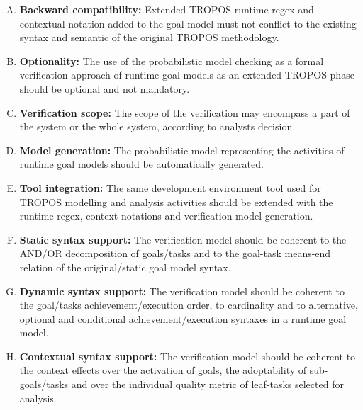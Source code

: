 \begin{enumerate}[R.1]

\item \textbf{Backward compatibility:} Extended TROPOS runtime regex and contextual notation added to the goal model must not conflict to the existing syntax and semantic of the original TROPOS methodology.

\item \textbf{Optionality:} The use of the probabilistic model checking as a formal verification approach of runtime goal models as an extended TROPOS phase should be optional and not mandatory.
\medskip

\item \textbf{Verification scope:} The scope of the verification may encompass a part of the system or the whole system, according to analysts decision.
\medskip

\item \textbf{Model generation:} The probabilistic model representing the activities of runtime goal models should be automatically generated.
\medskip

\item \textbf{Tool integration:} The same development environment tool used for TROPOS modelling and analysis activities should be extended with the runtime regex, context notations and verification model generation.
\medskip

\item \textbf{Static syntax support:} The verification model should be coherent to the AND/OR decomposition of goals/tasks and to the goal-task means-end relation of the original/static goal model syntax.
\medskip

\item \textbf{Dynamic syntax support:} The verification model should be coherent to the goal/tasks achievement/execution order, to cardinality and to alternative, optional and conditional achievement/execution syntaxes in a runtime goal model.
\medskip

\item \textbf{Contextual syntax support:} The verification model should be coherent to the context effects over the activation of goals, the adoptability of sub-goals/tasks and over the individual quality metric of leaf-tasks selected for analysis. 

\end{enumerate}